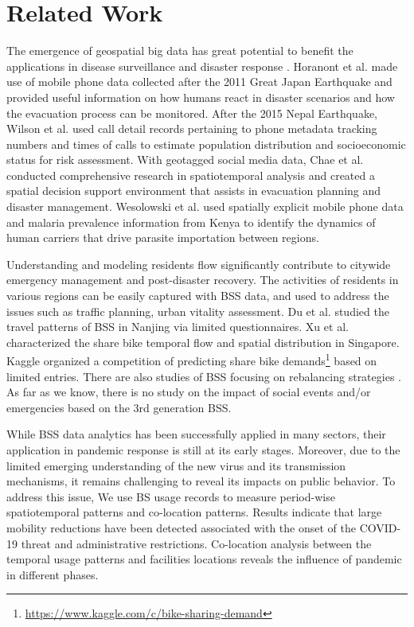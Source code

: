 \documentclass[preprints,ijgi,submit,moreauthors]{Definitions/mdpi}
\begin{document}
\section*{Related Work}
The emergence of geospatial big data has great potential to benefit the applications in disease surveillance and disaster response \cite{Yu2018Big, Goodchild2010Crowdsourcing, Huang2015Predicating}.
Horanont et al. \cite{Horanont2013Auto} made use of mobile phone data collected after the 2011 Great Japan Earthquake and provided useful information on how humans react in disaster scenarios and how the evacuation process can be monitored.
After the 2015 Nepal Earthquake, Wilson et al. \cite{Wilson2016Rapid} used call detail records pertaining to phone metadata tracking numbers and times of calls to estimate population distribution and socioeconomic status for risk assessment.
With geotagged social media data, Chae et al. \cite{CHAE2013Public} conducted comprehensive research in spatiotemporal analysis and created a spatial decision support environment that assists in evacuation planning and disaster management.
Wesolowski et al. \cite{Wesolowski2012Quantifying} used spatially explicit mobile phone data and malaria prevalence information from Kenya to identify the dynamics of human carriers that drive parasite importation between regions.

Understanding and modeling residents flow significantly contribute to citywide emergency management and post-disaster recovery.
The activities of residents in various regions can be easily captured with BSS data, and used to address the issues such as traffic planning, urban vitality assessment.
Du et al. \cite{du2018better} studied the travel patterns of BSS in Nanjing via limited questionnaires.
Xu et al. \cite{xu2019unravel} characterized the share bike temporal flow and spatial distribution in Singapore.
Kaggle organized a competition of predicting share bike demands\footnote{\url{https://www.kaggle.com/c/bike-sharing-demand}} based on limited entries.
There are also studies of BSS focusing on rebalancing strategies \cite{pal2017free, ai2019deep,chen2016dynamic}.
As far as we know, there is no study on the impact of social events and/or emergencies based on the 3rd generation BSS.

While BSS data analytics has been successfully applied in many sectors, their application in pandemic response is still at its early stages.
Moreover, due to the limited emerging understanding of the new virus and its transmission mechanisms, it remains challenging to reveal its impacts on public behavior.
To address this issue, We use BS usage records to measure period-wise spatiotemporal patterns and co-location patterns. 
Results indicate that large mobility reductions have been detected associated with the onset of the COVID-19 threat and administrative restrictions.
Co-location analysis between the temporal usage patterns and facilities locations reveals the influence of pandemic in different phases.
\end{document}
